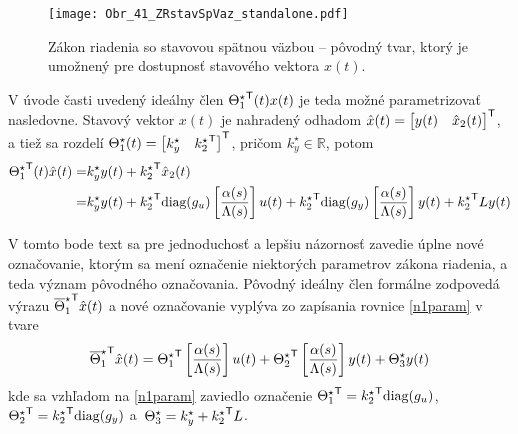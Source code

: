 \documentclass[a4paper, 10pt, ]{article}
\begin{document}
\begin{figure}[t]
    \centering
    \texttt{[image: Obr\_41\_ZRstavSpVaz\_standalone.pdf]}
    \caption{Zákon riadenia so stavovou spätnou väzbou -- pôvodný tvar, ktorý je umožnený pre dostupnosť stavového vektora $x(t)$.}
    \label{Obr_41_ZRstavSpVaz}
\end{figure}







V úvode časti uvedený ideálny člen ${\Theta_1^\star}^{\mathsf{T}}(t) x(t)$ je teda možné parametrizovať nasledovne. Stavový vektor $x(t)$ je nahradený odhadom $\hat{x}(t) = \begin{bmatrix} y(t) & \hat{x}_2(t) \end{bmatrix}^{\mathsf{T}}$, a tiež sa rozdelí $\Theta_1^\star(t) = \begin{bmatrix} k_y^\star & {k_2^\star}^{\mathsf{T}} \end{bmatrix}^{\mathsf{T}}$, pričom $k_y^\star \in \mathbb{R}$, potom
\begin{equation} \label{n1param}
	\begin{split}
		{\Theta_1^\star}^{\mathsf{T}}(t) \hat{x}(t)
		= &
		k_y^\star y(t) + {k_2^\star}^{\mathsf{T}} \hat{x}_2(t)
		\\ = &
		k_y^\star y(t)
		+
		{k_2^\star}^{\mathsf{T}}
		\text{diag}(g_u) \left[ \frac{\alpha(s)}{\Lambda(s)} \right] u(t)
		+
		{k_2^\star}^{\mathsf{T}}
		\text{diag}(g_y) \left[ \frac{\alpha(s)}{\Lambda(s)} \right] y(t)
		+ {k_2^\star}^{\mathsf{T}} L y(t)
	\end{split}
\end{equation}










V tomto bode text sa pre jednoduchosť a lepšiu názornosť zavedie úplne nové označovanie, ktorým sa mení označenie niektorých parametrov zákona riadenia, a teda význam pôvodného označovania. Pôvodný ideálny člen formálne zodpovedá výrazu ${\overline{\Theta}_1^\star}^{\mathsf{T}} \hat{x}(t)$ a nové označovanie vyplýva zo zapísania rovnice \eqref{n1param} v tvare
\begin{equation} \label{n1param2}
	{\overline{\Theta}_1^\star}^{\mathsf{T}} \hat{x}(t)
	=
	{\Theta_1^\star}^{\mathsf{T}} \left[ \frac{\alpha(s)}{\Lambda(s)} \right] u(t)
	+
	{\Theta_2^\star}^{\mathsf{T}} \left[ \frac{\alpha(s)}{\Lambda(s)} \right] y(t)
	+
	\Theta_3^\star y(t)
\end{equation}
kde sa vzhľadom na \eqref{n1param} zaviedlo označenie ${\Theta_1^\star}^{\mathsf{T}} = {k_2^\star}^{\mathsf{T}} \text{diag}(g_u)$,   ${\Theta_2^\star}^{\mathsf{T}} = {k_2^\star}^{\mathsf{T}} \text{diag}(g_y)$ a~$\Theta_3^\star = k_y^\star + {k_2^\star}^{\mathsf{T}} L$.
\end{document}
